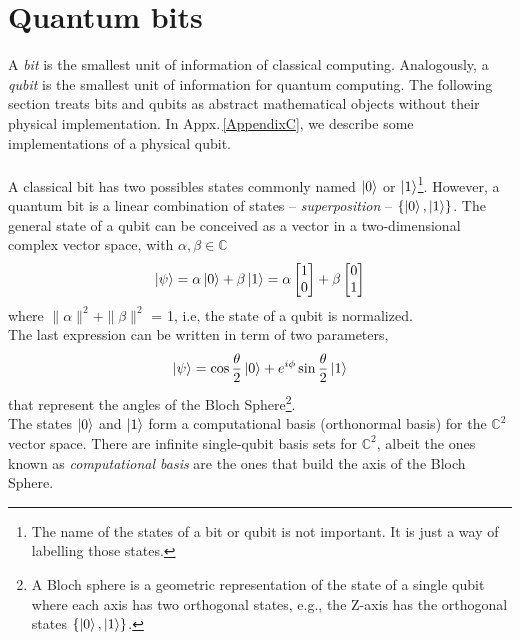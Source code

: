 \section{Quantum bits}
A \textit{bit} is the smallest unit of information of classical computing. Analogously, a \textit{qubit} is the smallest unit of information for quantum computing. The following section treats bits and qubits as abstract mathematical objects without their physical implementation. In Appx.\,\ref{AppendixC}, we describe some implementations of a physical qubit.\\\\
A classical bit has two possibles states commonly named $\ket{0}$ or $\ket{1}$\footnote{The name of the states of a bit or qubit is not important. It is just a way of labelling those states.}. However, a quantum bit is a linear combination of states -- \textit{superposition} -- $\{\ket{0}, \ket{1}\}$. The general state of a qubit can be conceived as a vector in a two-dimensional complex vector space, with $\alpha, \beta \in \mathbb{C}$
\begin{equation}
    \ket{\psi} = \alpha \ket{0} + \beta \ket{1} = \alpha \begin{bmatrix}
           1 \\
           0 
         \end{bmatrix}
         +
         \beta
         \begin{bmatrix}
           0 \\
           1 
         \end{bmatrix}
\end{equation}
where $\|\alpha\|^{2} + \|\beta\|^{2}$ = 1, i.e, the state of a qubit is normalized.\\
The last expression can be written in term of two parameters,
\begin{equation}
    \ket{\psi} = \cos{\frac{\theta}{2}}\ket{0} + e^{i\phi}\sin{\frac{\theta}{2}}\ket{1}
\end{equation}
that represent the angles of the Bloch Sphere\footnote{A Bloch sphere is a geometric representation of the state of a single qubit where each axis has two orthogonal states, e.g., the Z-axis has the orthogonal states $\{\ket{0},\ket{1}\}$.}.\\
The states $\ket{0}$ and $\ket{1}$ form a computational basis (orthonormal basis) for the $\mathbb{C}^{2}$ vector space. There are infinite single-qubit basis sets for $\mathbb{C}^{2}$, albeit the ones known as \textit{computational basis} are the ones that build the axis of the Bloch Sphere.

